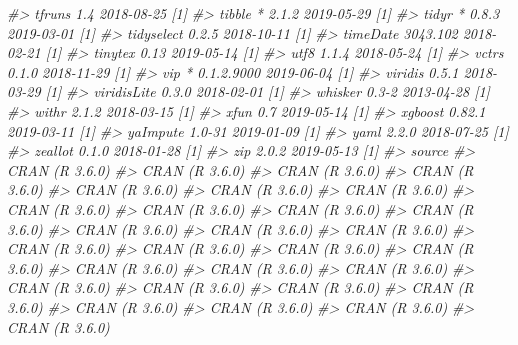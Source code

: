 \documentclass[]{krantz}
\makeatletter
\newenvironment{Shaded}{\begin{snugshade}}{\end{snugshade}}
\newcommand{\CommentTok}[1]{\textcolor[rgb]{0.37,0.37,0.37}{\textit{#1}}}
\newenvironment{kframe}{%
\medskip{}
\setlength{\fboxsep}{.8em}
 \def\at@end@of@kframe{}%
 \ifinner\ifhmode%
  \def\at@end@of@kframe{\end{minipage}}%
  \begin{minipage}{\columnwidth}%
 \fi\fi%
 \def\FrameCommand##1{\hskip\@totalleftmargin \hskip-\fboxsep
 \colorbox{shadecolor}{##1}\hskip-\fboxsep
     \hskip-\linewidth \hskip-\@totalleftmargin \hskip\columnwidth}%
 \MakeFramed {\advance\hsize-\width
   \@totalleftmargin\z@ \linewidth\hsize
   \@setminipage}}%
 {\par\unskip\endMakeFramed%
 \at@end@of@kframe}
\renewenvironment{Shaded}{\begin{kframe}}{\end{kframe}}
\makeatother
\begin{document}
\begin{Shaded}
\begin{Highlighting}[]
\CommentTok{#>    tfruns          1.4        2018-08-25 [1]}
\CommentTok{#>    tibble        * 2.1.2      2019-05-29 [1]}
\CommentTok{#>    tidyr         * 0.8.3      2019-03-01 [1]}
\CommentTok{#>    tidyselect      0.2.5      2018-10-11 [1]}
\CommentTok{#>    timeDate        3043.102   2018-02-21 [1]}
\CommentTok{#>    tinytex         0.13       2019-05-14 [1]}
\CommentTok{#>    utf8            1.1.4      2018-05-24 [1]}
\CommentTok{#>    vctrs           0.1.0      2018-11-29 [1]}
\CommentTok{#>    vip           * 0.1.2.9000 2019-06-04 [1]}
\CommentTok{#>    viridis         0.5.1      2018-03-29 [1]}
\CommentTok{#>    viridisLite     0.3.0      2018-02-01 [1]}
\CommentTok{#>    whisker         0.3-2      2013-04-28 [1]}
\CommentTok{#>    withr           2.1.2      2018-03-15 [1]}
\CommentTok{#>    xfun            0.7        2019-05-14 [1]}
\CommentTok{#>    xgboost         0.82.1     2019-03-11 [1]}
\CommentTok{#>    yaImpute        1.0-31     2019-01-09 [1]}
\CommentTok{#>    yaml            2.2.0      2018-07-25 [1]}
\CommentTok{#>    zeallot         0.1.0      2018-01-28 [1]}
\CommentTok{#>    zip             2.0.2      2019-05-13 [1]}
\CommentTok{#>  source                         }
\CommentTok{#>  CRAN (R 3.6.0)                 }
\CommentTok{#>  CRAN (R 3.6.0)                 }
\CommentTok{#>  CRAN (R 3.6.0)                 }
\CommentTok{#>  CRAN (R 3.6.0)                 }
\CommentTok{#>  CRAN (R 3.6.0)                 }
\CommentTok{#>  CRAN (R 3.6.0)                 }
\CommentTok{#>  CRAN (R 3.6.0)                 }
\CommentTok{#>  CRAN (R 3.6.0)                 }
\CommentTok{#>  CRAN (R 3.6.0)                 }
\CommentTok{#>  CRAN (R 3.6.0)                 }
\CommentTok{#>  CRAN (R 3.6.0)                 }
\CommentTok{#>  CRAN (R 3.6.0)                 }
\CommentTok{#>  CRAN (R 3.6.0)                 }
\CommentTok{#>  CRAN (R 3.6.0)                 }
\CommentTok{#>  CRAN (R 3.6.0)                 }
\CommentTok{#>  CRAN (R 3.6.0)                 }
\CommentTok{#>  CRAN (R 3.6.0)                 }
\CommentTok{#>  CRAN (R 3.6.0)                 }
\CommentTok{#>  CRAN (R 3.6.0)                 }
\CommentTok{#>  CRAN (R 3.6.0)                 }
\CommentTok{#>  CRAN (R 3.6.0)                 }
\CommentTok{#>  CRAN (R 3.6.0)                 }
\CommentTok{#>  CRAN (R 3.6.0)                 }
\CommentTok{#>  CRAN (R 3.6.0)                 }
\CommentTok{#>  CRAN (R 3.6.0)                 }
\CommentTok{#>  CRAN (R 3.6.0)                 }
\CommentTok{#>  CRAN (R 3.6.0)                 }
\CommentTok{#>  CRAN (R 3.6.0)                 }
\CommentTok{#>  CRAN (R 3.6.0)                 }

\end{Highlighting}
\end{Shaded}
\end{document}
